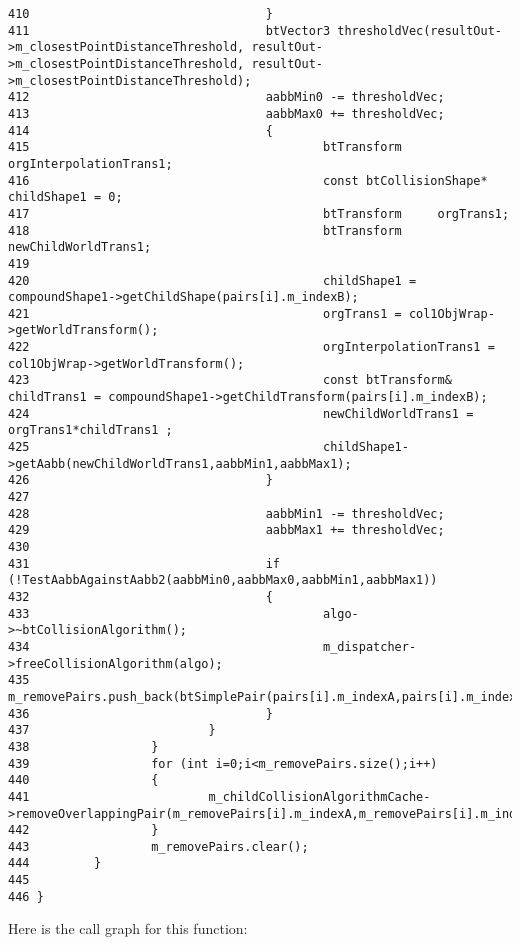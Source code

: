 \begin{Code}
\begin{verbatim}
410                                 }
411                                 btVector3 thresholdVec(resultOut->m_closestPointDistanceThreshold, resultOut->m_closestPointDistanceThreshold, resultOut->m_closestPointDistanceThreshold);
412                                 aabbMin0 -= thresholdVec;
413                                 aabbMax0 += thresholdVec;
414                                 {
415                                         btTransform     orgInterpolationTrans1;
416                                         const btCollisionShape* childShape1 = 0;
417                                         btTransform     orgTrans1;
418                                         btTransform     newChildWorldTrans1;
419 
420                                         childShape1 = compoundShape1->getChildShape(pairs[i].m_indexB);
421                                         orgTrans1 = col1ObjWrap->getWorldTransform();
422                                         orgInterpolationTrans1 = col1ObjWrap->getWorldTransform();
423                                         const btTransform& childTrans1 = compoundShape1->getChildTransform(pairs[i].m_indexB);
424                                         newChildWorldTrans1 = orgTrans1*childTrans1 ;
425                                         childShape1->getAabb(newChildWorldTrans1,aabbMin1,aabbMax1);
426                                 }
427                                 
428                                 aabbMin1 -= thresholdVec;
429                                 aabbMax1 += thresholdVec;
430 
431                                 if (!TestAabbAgainstAabb2(aabbMin0,aabbMax0,aabbMin1,aabbMax1))
432                                 {
433                                         algo->~btCollisionAlgorithm();
434                                         m_dispatcher->freeCollisionAlgorithm(algo);
435                                         m_removePairs.push_back(btSimplePair(pairs[i].m_indexA,pairs[i].m_indexB));
436                                 }
437                         }
438                 }
439                 for (int i=0;i<m_removePairs.size();i++)
440                 {
441                         m_childCollisionAlgorithmCache->removeOverlappingPair(m_removePairs[i].m_indexA,m_removePairs[i].m_indexB);
442                 }
443                 m_removePairs.clear();
444         }
445 
446 }
\end{verbatim}
\end{Code}




Here is the call graph for this function:

